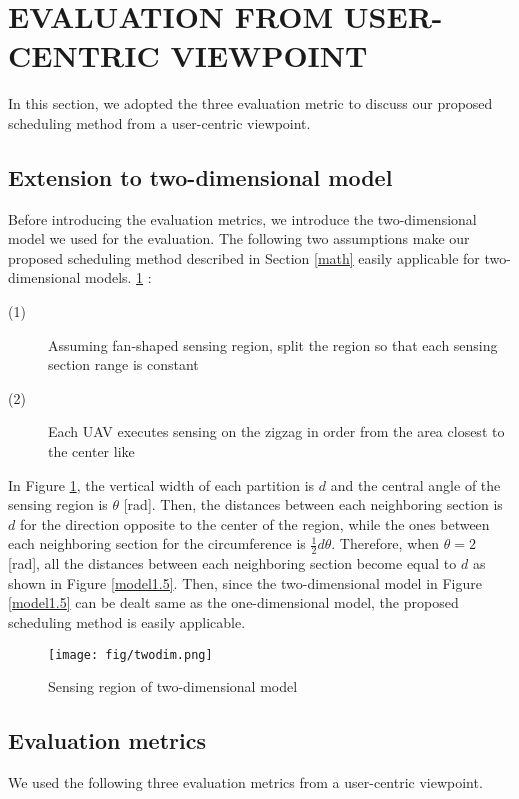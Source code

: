 \documentclass{ieeeaccess}
\begin{document}
\section{EVALUATION FROM USER-CENTRIC VIEWPOINT}
In this section, we adopted the three evaluation metric to discuss our proposed scheduling method from a user-centric viewpoint.

\subsection{Extension to two-dimensional model}\label{twodi}
Before introducing the evaluation metrics, we introduce the two-dimensional model we used for the evaluation.
The following two assumptions make our proposed scheduling method described in Section \ref{math} easily applicable for two-dimensional models.
\ref{twodimention} :

\begin{description}

\item[(1)]  Assuming fan-shaped sensing region, split the region so that each sensing section range is constant
\item[(2)] Each UAV executes sensing on the zigzag in order from the area closest to the center like \cite{Maza2007}
\end{description}

In Figure \ref{twodimention}, the vertical width of each partition is $d$ and the central angle of the sensing region is $\theta$ [rad].
Then, the distances between each neighboring section is $d$ for the direction opposite to the center of the region, while the ones between each neighboring section for the circumference is $\frac{1}{2}d\theta$.
Therefore, when $\theta=2$ [rad], all the distances between each neighboring section become equal to $d$ as shown in Figure \ref{model1.5}.
Then, since the two-dimensional model in Figure \ref{model1.5} can be dealt same as the one-dimensional model, the proposed scheduling method is easily applicable.

\begin{figure}[t]
\begin{center}
\texttt{[image: fig/twodim.png]}
\caption{Sensing region of two-dimensional model}
\label{twodimention}
\end{center}
\end{figure}

\subsection{Evaluation metrics}\label{compare}
We used the following three evaluation metrics from a user-centric viewpoint.
\end{document}
